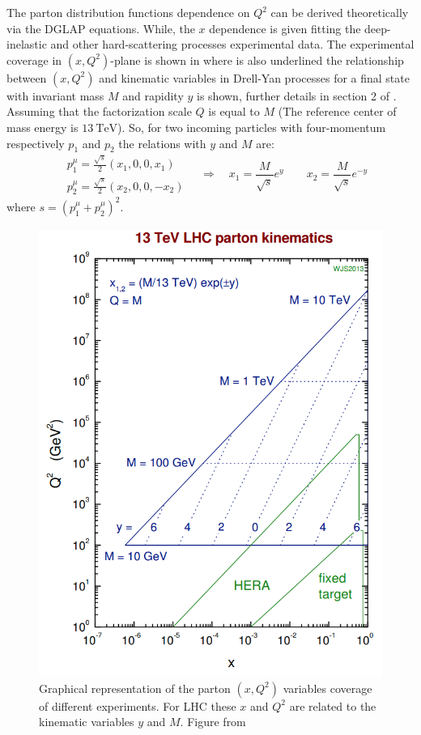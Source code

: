 The parton distribution functions dependence on $Q^2$ can be derived theoretically via the DGLAP equations. While, the $x$ dependence is given fitting the deep-inelastic and other hard-scattering processes experimental data.
The experimental coverage in $(x,Q^2)$-plane is shown in  
where is also underlined the relationship between $(x,Q^2)$ and kinematic variables in Drell-Yan processes for a final state with invariant mass $M$ and rapidity $y$ is shown, further details in section 2 of \cite{Campbell2006}. Assuming that the factorization scale $Q$ is equal to $M$ (The reference center of mass energy is $13\ \mathrm{TeV}$). So, for two incoming particles with four-momentum respectively $p_1$ and $p_2$ the relations with $y$ and $M$ are:  
\begin{equation}
	\begin{aligned}
		&p_1^\mu=\frac{\sqrt{s}}{2}(x_1,0,0,x_1)\\
&p_2^\mu=\frac{\sqrt{s}}{2}(x_2,0,0,-x_2)
	\end{aligned} \quad\Longrightarrow\quad x_1=\frac{M}{\sqrt{s}}e^y\qquad x_2=\frac{M}{\sqrt{s}}e^{-y}
\end{equation}
where  $s=(p_1^\mu+p_2^\mu)^2$.


\begin{figure}[!ht]
	\centering 	
	\includegraphics[width=12cm]{img/xQ2planeCoverage.png}
	\caption{Graphical representation of the parton $(x,Q^2)$ variables coverage of different experiments. For LHC these $x$ and $Q^2$ are related to the kinematic variables $y$ and $M$. Figure from \cite{StirlingPrivate}}
		\label{figure:xQ2planeCoverage}
\end{figure}


